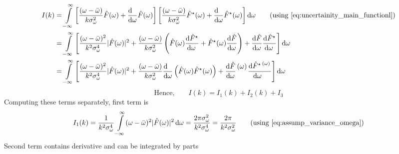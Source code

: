 \documentclass[11pt, a4paper]{article}
\newcommand{\numerator}[1]{\genfrac{}{}{0pt}{}{#1}{}}
\newcommand{\eqrefnp}[1]{\textup{\ref{#1}}}
\newcommand{\variance}[1]{\sigma_{#1}^{2}}
\newcommand{\stdev}[1]{\sigma_{#1}}
\newcommand{\diff}{\mathop{}\!\mathrm{d}}
\newcommand{\domega}{\diff \omega}
\newcommand{\derv}[1]{\frac{\diff \hfill}{\diff #1}}	%
\newcommand{\dervb}[2]{\derv{#1} \left(#2\right)}  %
\newcommand{\dervf}[2]{\frac{\diff #2}{\diff #1 \hfil}}	%
\newcommand{\dint}[2]{\int \limits_{#1}^{#2}}  %
\newcommand{\intinfty}{\dint{-\infty}{\infty}}	%
\begin{document}
\begin{align*}
	I(k) & = \intinfty \left[\frac{(\omega - \bar{\omega})}{k \variance{\omega}} \hat{F}(\omega) + \derv{\omega}\hat{F}(\omega)\right] \left[\frac{(\omega - \bar{\omega})}{k \variance{\omega}} \hat{F}^{\star}(\omega) + \derv{\omega}\hat{F}^{\star}(\omega)\right] \domega \tag{using \eqrefnp{eq:uncertainity_main_functionl}} \\
	& = \intinfty \left[\frac{(\omega - \bar{\omega})^{2}}{k^{2} \stdev{\omega}^{4}} |\hat{F}(\omega)|^{2} + \frac{(\omega - \bar{\omega})}{k \variance{\omega}}\left(\hat{F}(\omega) \dervf{\omega}{\hat{F}^{\star}} + \hat{F}^{\star}(\omega) \dervf{\omega}{\hat{F}} \right) + \dervf{\omega}{\hat{F}} \dervf{\omega}{\hat{F}^{\star}}
	\right] \domega \\
	& = \intinfty \left[\frac{(\omega - \bar{\omega})^{2}}{k^{2} \stdev{\omega}^{4}} |\hat{F}(\omega)|^{2} + \frac{(\omega - \bar{\omega})}{k \variance{\omega}}\dervb{\omega}{\hat{F}(\omega) \hat{F}^{\star}(\omega)} + \dervf{\omega}{\hat{F}}\numerator{(\omega)} \dervf{\omega}{\hat{F}^{\star}\numerator{(\omega)}}
	\right] \domega
\end{align*}
\begin{equation}\label{eq:uncertainty_integral_triplet}
	\text{Hence,} \qquad I(k) = I_{1}(k) + I_{2}(k) + I_{3}
\end{equation}
Computing these terms separately, first term is
\begin{equation}\label{eq:uncertainty_integral_part1}
	I_{1}(k) = \frac{1}{k^{2} \stdev{\omega}^{4}} \intinfty (\omega - \bar{\omega})^{2} |\hat{F}(\omega)|^{2} \domega = \frac{2 \pi \variance{\omega}}{k^{2} \stdev{\omega}^{4}} = \frac{2\pi}{k^{2} \variance{\omega}} \qquad \text{(using \eqrefnp{eq:assump_variance_omega})}
\end{equation}
Second term contains derivative and can be integrated by parts 
\end{document}
